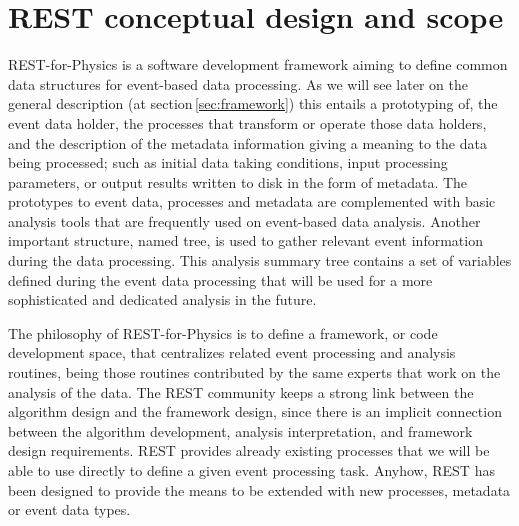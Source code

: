 \section{REST conceptual design and scope}
\label{sec:conception}



REST-for-Physics is a software development framework aiming to define common data structures for event-based data processing. As we will see later on the general description (at section\,\ref{sec:framework}) this entails a prototyping of, the event data holder, the processes that transform or operate those data holders, and the description of the metadata information giving a meaning to the data being processed; such as initial data taking conditions, input processing parameters, or output results written to disk in the form of metadata.
The prototypes to event data, processes and metadata are complemented  with basic analysis tools that are frequently used on event-based data analysis. Another important structure, named tree, is used to gather relevant event information during the data processing. This analysis summary tree contains a set of variables defined during the event data processing that will be used for a more sophisticated and dedicated analysis in the future.

The philosophy of REST-for-Physics is to define a framework, or code development space, that centralizes related event processing and analysis routines, being those routines contributed by the same experts that work on the analysis of the data. The REST community keeps a strong link between the algorithm design and the framework design, since there is an implicit connection between the algorithm development, analysis interpretation, and framework design requirements. REST provides already existing processes that we will be able to use directly to define a given event processing task. Anyhow, REST has been designed to provide the means to be extended with new processes, metadata or event data types.

